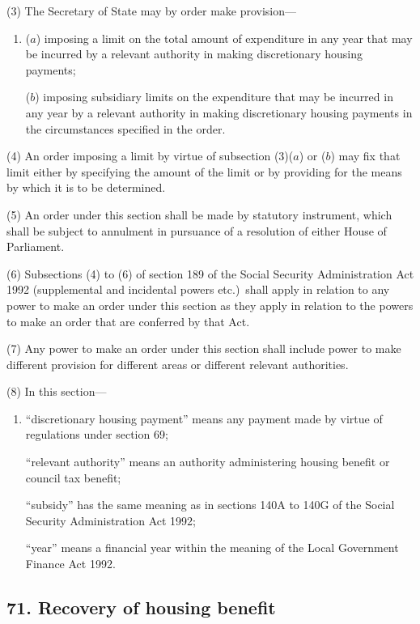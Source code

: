 \documentclass[12pt,a4paper]{article}
\begin{document}
(3) The Secretary of State may by order make provision—
\begin{enumerate}\item[]
($a$) imposing a limit on the total amount of expenditure in any year that may be incurred by a relevant authority in making discretionary housing payments;

($b$) imposing subsidiary limits on the expenditure that may be incurred in any year by a relevant authority in making discretionary housing payments in the circumstances specified in the order.
\end{enumerate}

(4) An order imposing a limit by virtue of subsection (3)($a$)  or ($b$)  may fix that limit either by specifying the amount of the limit or by providing for the means by which it is to be determined.

(5) An order under this section shall be made by statutory instrument, which shall be subject to annulment in pursuance of a resolution of either House of Parliament.

(6) Subsections (4)  to (6)  of section 189 of the Social Security Administration Act 1992 (supplemental and incidental powers etc.)\ shall apply in relation to any power to make an order under this section as they apply in relation to the powers to make an order that are conferred by that Act.

(7) Any power to make an order under this section shall include power to make different provision for different areas or different relevant authorities.

(8) In this section—
\begin{enumerate}\item[]
    “discretionary housing payment” means any payment made by virtue of regulations under section 69;

    “relevant authority” means an authority administering housing benefit or council tax benefit;

    “subsidy” has the same meaning as in sections 140A to 140G of the Social Security Administration Act 1992;

    “year” means a financial year within the meaning of the Local Government Finance Act 1992.  
\end{enumerate}


\subsection{71. Recovery of housing benefit}
\end{document}
